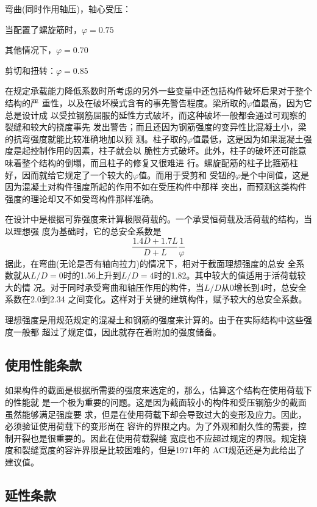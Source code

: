 \documentclass[12pt,a4paper]{book}
\begin{document}
弯曲(同时作用轴压)，轴心受压：

当配置了螺旋筋时，$\varphi=0.75$

其他情况下，$\varphi=0.70$

剪切和扭转：$\varphi=0.85$

在规定承载能力降低系数时所考虑的另外一些变量中还包括构件破坏后果对于整个结构的严
重性，以及在破坏模式含有的事先警告程度。梁所取的$\varphi$值最高，因为它总是设计成
以受拉钢筋屈服的延性方式破坏，而这种破坏一般都会通过可观察的裂缝和较大的挠度事先
发出警告；而且还因为钢筋强度的变异性比混凝土小，梁的抗弯强度就能比较准确地加以预
测。柱子取的$\varphi$值最低，这是因为如果混凝土强度是起控制作用的因素，柱子就会以
脆性方式破坏。此外，柱子的破坏还可能意味着整个结构的倒塌，而且柱子的修复又很难进
行。螺旋配筋的柱子比箍筋柱好，因而就给它规定了一个较大的$\varphi$值。而用于受剪和
受钮的$\varphi$是个中间值，这是因为混凝土对构件强度所起的作用不如在受压构件中那样
突出，而预测这类构件强度的理论却又不如受弯构件那样准确。

在设计中是根据可靠强度来计算极限荷载的。一个承受恒荷载及活荷载的结构，当以理想强
度为基础时，它的总安全系数是
\begin{equation}
  \label{eq:4} \frac{1.4D+1.7L}{D+L}\frac{1}{\varphi}
\end{equation}据此，在弯曲(无论是否有轴向拉力)的情况下，相对于截面理想强度的总安
全系数就从$L/D=0$时的1.56上升到$L/D=4$时的1.82。其中较大的值适用于活荷载较大的情
况。对于同时承受弯曲和轴压作用的构件，当$L/D$从0增长到4时，总安全系数在2.0到2.34
之间变化。这样对于关键的建筑构件，赋予较大的总安全系数。

理想强度是用规范规定的混凝土和钢筋的强度来计算的。由于在实际结构中这些强度一般都
超过了规定值，因此就存在着附加的强度储备。

\subsection{使用性能条款}

如果构件的截面是根据所需要的强度来选定的，那么，估算这个结构在使用荷载下的性能就
是一个极为重要的问题。这是因为截面较小的构件和受压钢筋少的截面虽然能够满足强度要
求，但是在使用荷载下却会导致过大的变形及应力。因此，必须验证使用荷载下的变形尚在
容许的界限之内。为了外观和耐久性的需要，控制开裂也是很重要的。因此在使用荷载裂缝
宽度也不应超过规定的界限。规定挠度和裂缝宽度的容许界限是比较困难的，但是1971年的
ACI规范还是为此给出了建议值。

\subsection{延性条款}
\end{document}
